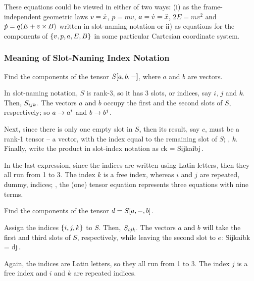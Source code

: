 These equations could be viewed in either of two ways: (i) as the frame-independent geometric laws $v = \dot{x}$, $p = mv$, $a = \dot{v} = \ddot{x}$, $2E = mv^2$ and $\dot{p} = q(E + v\operatorname{\times} B)$ written in slot-naming notation or ii) as equations for the components of $\left\lbrace{v,p,a,E,B}\right\rbrace$ in some particular Cartesian coordinate system.


\subsubsection{Meaning of Slot-Naming Index Notation}

\begin{example}
Find the components of the tensor $S\!\left[{a,b,-}\right]$, where $a$ and $b$ are vectors.
\end{example}

\begin{solution}
In slot-naming notation, $S$ is rank-3, so it has 3 slots, or indices, say $i$, $j$ and $k$. Then, ${S}_{ijk}$. The vectors $a$ and $b$ occupy the first and the second slots of $S$, respectively; so $a\to{a}^{i}$ and $b\to{b}^{j}$. 

Next, since there is only one empty slot in $S$, then its result, say $c$, must be a rank-1 tensor -- a vector, with the index equal to the remaining slot of $S$; \viz, $k$. Finally, write the product in slot-index notation as 
\beq
\cnvec ck = \cnvec S{ijk}\cnvec ai\cnvec bj\,.
\eeq

In the last expression, since the indices are written using Latin letters, then they all run from 1 to 3. The index $k$ is a free index, whereas $i$ and $j$ are repeated, \aka dummy, indices; \ie, the (one) tensor equation represents three equations with nine terms.
\end{solution}


\begin{example}
Find the components of the tensor $d = S\!\left[{a,-, b}\right]$.
\end{example}

\begin{solution}
Assign the indices $\left\lbrace{i,j,k}\right\rbrace$ to $S$. Then, ${S}_{ijk}$. The vectors $a$ and $b$ will take the first and third slots of $S$, respectively, while leaving the second slot to $e$:
\beq
\covec S{ijk}\cnvec ai\cnvec bk = \cnvec dj\,.
\eeq

Again, the indices are Latin letters, so they all run from 1 to 3. The index $j$ is a free index and $i$ and $k$ are  repeated indices.
\end{solution}


